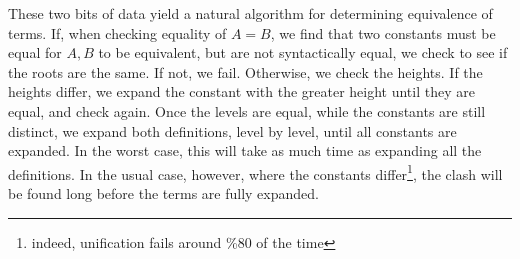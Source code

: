 \documentclass[11pt,twoside]{article}
\begin{document}
These two bits of data yield a natural algorithm for determining 
equivalence of terms.  If, when checking equality of $A=B$,
we find that two constants must be equal for $A,B$ to
be equivalent, but are not syntactically equal, 
we check to see if the roots are the same.
If not, we fail.  Otherwise, we check the heights.  If the heights
differ, we expand the constant with the greater height until 
they are equal, and check again.  Once the levels
are equal, while the constants are still distinct, we 
expand both definitions, level by level, until all constants
are expanded.  In the worst case, this will take as much time
as expanding all the definitions.  In the usual case, however,
where the constants differ\footnote{indeed, unification fails
around \%80 of the time}, the clash will be found long before
the terms are fully expanded.  













\end{document}
